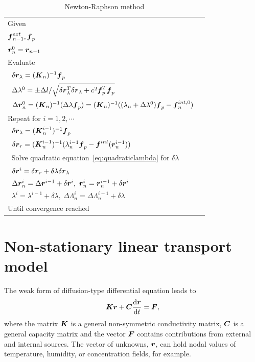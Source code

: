 \begin{table}[h!]
  \begin{center}
  \begin{tabular}{|l|l|}
    \hline
    Given \\
    \;\;$\mbox{\boldmath$f$}^{ext}_{n-1}, \mbox{\boldmath$f$}_p$\\
    \;\;$\mbox{\boldmath$r$}^{0}_{n} = \mbox{\boldmath$r$}_{n-1}$\\
    Evaluate\\
    $\;\;\delta\mbox{\boldmath$r$}_\lambda = (\mbox{\boldmath$K$}_n)^{-1}\mbox{\boldmath$f$}_p$\\
    $\;\;\Delta\lambda^0=\pm{\Delta l}/{\sqrt{\delta\mbox{\boldmath$r$}_\lambda^T\delta\mbox{\boldmath$r$}_\lambda+c^2\mbox{\boldmath$f$}_p^T\mbox{\boldmath$f$}_p}}$\\
    $\;\;\Delta\mbox{\boldmath$r$}_n^0 = (\mbox{\boldmath$K$}_n)^{-1}(\Delta\lambda\mbox{\boldmath$f$}_p) = (\mbox{\boldmath$K$}_n)^{-1}((\lambda_n+\Delta\lambda^0)\mbox{\boldmath$f$}_p - \mbox{\boldmath$f$}^{int,0}_n)$\\
    Repeat for $i=1,2,\cdots$\\ 
    $\;\;\delta\mbox{\boldmath$r$}_\lambda = (\mbox{\boldmath$K$}_n^{i-1})^{-1}\mbox{\boldmath$f$}_p$\\
    $\;\;\delta\mbox{\boldmath$r$}_r = (\mbox{\boldmath$K$}_n^{i-1})^{-1}(\lambda_n^{i-1}\mbox{\boldmath$f$}_p-\mbox{\boldmath$f$}^{int}(\mbox{\boldmath$r$}_n^{i-1}))$\\
    $\;\;$Solve quadratic equation~\ref{eq:quadraticlambda} for $\delta\lambda$\\
    $\;\;\delta\mbox{\boldmath$r$}^i = \delta\mbox{\boldmath$r$}_r+\delta\lambda\delta\mbox{\boldmath$r$}_\lambda$\\
    $\;\;\Delta\mbox{\boldmath$r$}_n^i = \Delta\mbox{\boldmath$r$}^{i-1}+\delta\mbox{\boldmath$r$}^i,\ \mbox{\boldmath$r$}_n^i = \mbox{\boldmath$r$}_n^{i-1}+\delta\mbox{\boldmath$r$}^i$\\
    $\;\;\lambda^i = \lambda^{i-1}+\delta\lambda,\ \Delta\Lambda_n^i = \Delta\Lambda_n^{i-1}+\delta\lambda$\\
    Until convergence reached\\
    \hline
  \end{tabular}
  \end{center}
  \caption{Newton-Raphson method}
  \label{tab:newtonraphson}
\end{table}












\section{Non-stationary linear transport model}
\label{NonLinTrans}
The weak form of diffusion-type differential equation leads to
\begin{eqnarray}
\mbox{\boldmath$K$} \mbox{\boldmath$r$} + \mbox{\boldmath$C$}\frac{{\rm d}\mbox{\boldmath$r$}}{{\rm d} t} = \mbox{\boldmath$F$}\label{NonLinTrans:1},
\end{eqnarray}
where the matrix $\mbox{\boldmath$K$}$ is a general non-symmetric conductivity matrix, $\mbox{\boldmath$C$}$ is a general capacity matrix and the vector $\mbox{\boldmath$F$}$ contains contributions from external and internal sources. The vector of unknowns, $\mbox{\boldmath$r$}$, can hold nodal values of temperature, humidity, or concentration fields, for example.


